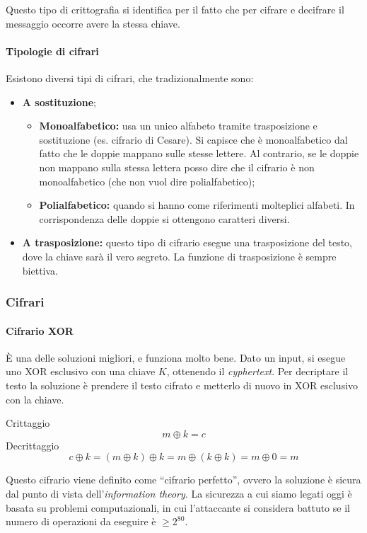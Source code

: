 Questo tipo di crittografia si identifica per il fatto che per cifrare e 
decifrare il messaggio occorre avere la stessa chiave.

\paragraph*{Tipologie di cifrari} Esistono diversi tipi di cifrari, che 
tradizionalmente sono:
\begin{itemize}
 \item \textbf{A sostituzione};
 \begin{itemize}
  \item \textbf{Monoalfabetico:} usa un unico alfabeto tramite trasposizione e 
sostituzione (es. cifrario di Cesare). Si capisce che è monoalfabetico dal fatto 
che le doppie mappano sulle stesse lettere.
Al contrario, se le doppie non mappano sulla stessa lettera posso dire che il 
cifrario è non monoalfabetico (che non vuol dire polialfabetico);
  \item \textbf{Polialfabetico:} quando si hanno come riferimenti molteplici alfabeti.
 In corrispondenza delle doppie si ottengono caratteri diversi.
 \end{itemize}
 \item \textbf{A trasposizione:} questo tipo di cifrario esegue una trasposizione del testo, dove la chiave sarà 
il vero segreto. La funzione di trasposizione è sempre biettiva. 
\end{itemize}

\subsubsection{Cifrari}

\paragraph{Cifrario XOR}

È una delle soluzioni migliori, e funziona molto bene. Dato un input, si esegue 
uno XOR esclusivo con una chiave $K$, ottenendo il \textit{cyphertext}. Per 
decriptare il testo la soluzione è prendere il testo cifrato e metterlo di nuovo 
in XOR esclusivo con la chiave.

Crittaggio
$$
m \oplus k = c
$$
\indent Decrittaggio
$$
c \oplus k = (m \oplus k) \oplus k = m \oplus (k \oplus k) = m \oplus 0 = m
$$

Questo cifrario viene definito come ``cifrario perfetto'', ovvero la soluzione è 
sicura dal punto di vista dell'\textit{information theory}. La sicurezza a cui 
siamo legati oggi è basata su problemi computazionali, in cui l'attaccante si 
considera battuto se il numero di operazioni da eseguire è $\ge 2^{80}$.

